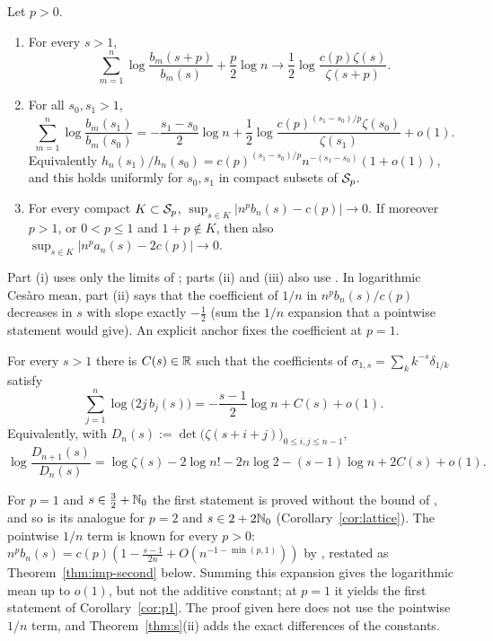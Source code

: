 \begin{theorem}\label{thm:s}
Let $p>0$.
\begin{enumerate}
\item[\textup{(i)}] For every $s>1$,
  \[
    \sum_{m=1}^n\log\frac{b_m(s+p)}{b_m(s)}+\frac p2\log n\longrightarrow\frac12\log\frac{c(p)\zeta(s)}{\zeta(s+p)}.
  \]
\item[\textup{(ii)}] For all $s_0,s_1>1$,
  \[
    \sum_{m=1}^n\log\frac{b_m(s_1)}{b_m(s_0)}=-\frac{s_1-s_0}2\log n
    +\frac12\log\frac{c(p)^{(s_1-s_0)/p}\zeta(s_0)}{\zeta(s_1)}+o(1).
  \]
  Equivalently $h_n(s_1)/h_n(s_0)=c(p)^{(s_1-s_0)/p}n^{-(s_1-s_0)}(1+o(1))$, and this holds uniformly for $s_0,s_1$
  in compact subsets of $\mathcal{S}_p$.
\item[\textup{(iii)}] For every compact $K\subset\mathcal{S}_p$, $\sup_{s\in K}|n^pb_n(s)-c(p)|\to0$. If moreover $p>1$, or
  $0<p\le1$ and $1+p\notin K$, then also $\sup_{s\in K}|n^pa_n(s)-2c(p)|\to0$.
\end{enumerate}
\end{theorem}

Part (i) uses only the limits of \cite[Corollary~1.3]{PaperII}; parts (ii) and (iii) also use \tailbound{}. In
logarithmic Ces\`aro mean, part (ii) says that the coefficient of $1/n$ in $n^pb_n(s)/c(p)$ decreases in $s$ with slope
exactly $-\frac12$ (sum the $1/n$ expansion that a pointwise statement would give). An explicit anchor fixes the
coefficient at $p=1$.

\begin{corollary}[the averaged $1/n$ coefficient at $p=1$]\label{cor:p1}
For every $s>1$ there is $C(s)\in\mathbb{R}$ such that the coefficients of $\sigma_{1,s}=\sum_kk^{-s}\delta_{1/k}$ satisfy
\[
  \sum_{j=1}^n\log\bigl(2j\,b_j(s)\bigr)=-\frac{s-1}2\log n+C(s)+o(1).
\]
Equivalently, with $D_n(s):=\det\bigl(\zeta(s+i+j)\bigr)_{0\le i,j\le n-1}$,
\[
  \log\frac{D_{n+1}(s)}{D_n(s)}=\log\zeta(s)-2\log n!-2n\log2-(s-1)\log n+2C(s)+o(1).
\]
\end{corollary}

For $p=1$ and $s\in\frac32+\mathbb{N}_0$ the first statement is proved without the bound of \tailbound{}, and so is its
analogue for $p=2$ and $s\in2+2\mathbb{N}_0$ (Corollary~\ref{cor:lattice}). The pointwise $1/n$ term is known for every
$p>0$: $n^pb_n(s)=c(p)(1-\frac{s-1}{2n}+O(n^{-1-\min(p,1)}))$ by \cite[Theorem~1.4]{PaperII}, restated as
Theorem~\ref{thm:imp-second} below. Summing this expansion gives the logarithmic mean up to $o(1)$, but not the
additive constant; at $p=1$ it yields the first statement of Corollary~\ref{cor:p1}. The proof given here does not use the
pointwise $1/n$ term, and Theorem~\ref{thm:s}(ii) adds the exact differences of the constants.

